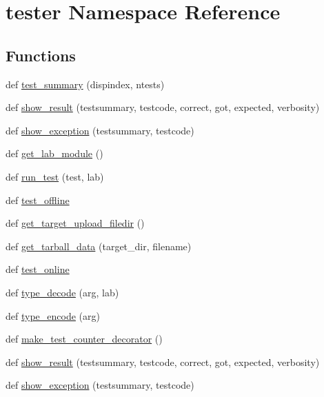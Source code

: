 \hypertarget{namespacetester}{}\section{tester Namespace Reference}
\label{namespacetester}
\subsection*{Functions}
\begin{DoxyCompactItemize}
\item 
def \hyperlink{namespacetester_aedd3dc82e5fcdcd7356eedb2e6bd25c4}{test\+\_\+summary} (dispindex, ntests)
\item 
def \hyperlink{namespacetester_a6f608a4c1c426885e10fda8317ec38cc}{show\+\_\+result} (testsummary, testcode, correct, got, expected, verbosity)
\item 
def \hyperlink{namespacetester_ad1e0737b7db28310d56e78c79dbd820b}{show\+\_\+exception} (testsummary, testcode)
\item 
def \hyperlink{namespacetester_ae02bbfd9f3e0bad1e95f19ce0ad66ec9}{get\+\_\+lab\+\_\+module} ()
\item 
def \hyperlink{namespacetester_a2fe765d77ce8821b7a2bbaf02b1443be}{run\+\_\+test} (test, lab)
\item 
def \hyperlink{namespacetester_a1327ef384b1cbd6f10cf76d2cd4a6a97}{test\+\_\+offline}
\item 
def \hyperlink{namespacetester_a30fd214430a64513171aa6c98c385698}{get\+\_\+target\+\_\+upload\+\_\+filedir} ()
\item 
def \hyperlink{namespacetester_a8623562b5ff751a84a2e4554e65ef6f0}{get\+\_\+tarball\+\_\+data} (target\+\_\+dir, filename)
\item 
def \hyperlink{namespacetester_a05f28fdefc42c5729e56a320573d6cf9}{test\+\_\+online}
\item 
def \hyperlink{namespacetester_a51774ebb553093352f0999e266e05126}{type\+\_\+decode} (arg, lab)
\item 
def \hyperlink{namespacetester_ab0070cd7f476a591eddf95f7e39a3536}{type\+\_\+encode} (arg)
\item 
def \hyperlink{namespacetester_abfb0fa8db29063fca62d022ea24d58c7}{make\+\_\+test\+\_\+counter\+\_\+decorator} ()
\item 
def \hyperlink{namespacetester_af0c58d2c2dd103105de51664a19f2d10}{show\+\_\+result} (testsummary, testcode, correct, got, expected, verbosity)
\item 
def \hyperlink{namespacetester_a1a133be93f0fb7bd4734641d6a8f94f1}{show\+\_\+exception} (testsummary, testcode)

\end{DoxyCompactItemize}
